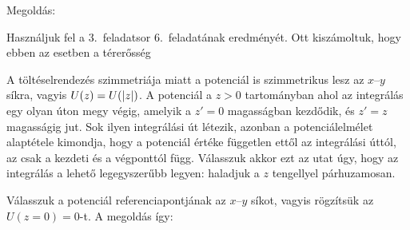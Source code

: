 
\ifdefined\megoldas
  
 Megoldás: 

 Használjuk fel a 3.~feladatsor 6.~feladatának eredményét. Ott kiszámoltuk, hogy ebben az esetben a térerősség 

 A töltéselrendezés szimmetriája miatt a potenciál is szimmetrikus lesz az $x$--$y$ síkra, vagyis $U(z)=U(\left\lvert z\right\rvert)$. A potenciál a $z>0$ tartományban
 ahol az integrálás egy olyan úton megy végig, amelyik a $z'=0$ magasságban kezdődik, és $z'=z$ magasságig jut. Sok ilyen integrálási út létezik, azonban a potenciálelmélet alaptétele kimondja, hogy a potenciál értéke független ettől az integrálási úttól, az csak a kezdeti és a végponttól függ. Válasszuk akkor ezt az utat úgy, hogy az integrálás a lehető legegyszerűbb legyen: haladjuk a $z$ tengellyel párhuzamosan. 


 Válasszuk a potenciál referenciapontjának az $x$--$y$ síkot, vagyis rögzítsük az $U(z=0)=0$-t. A megoldás így:
 
\fi
